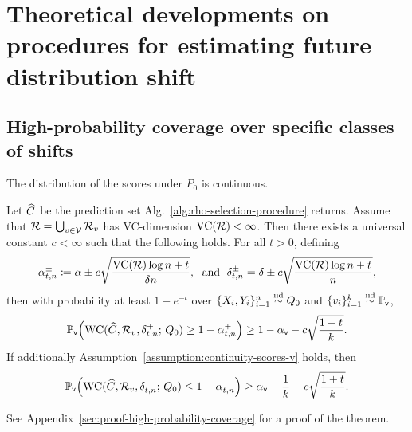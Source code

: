 \section{Theoretical developments on procedures for estimating future distribution shift}

\subsection{High-probability coverage over specific classes of shifts}
\label{sec:adaptive_procedure_shifts_high_prob_coverage}

\begin{assumption}
  \label{assumption:continuity-scores-v}
  The distribution of the scores under $P_0$ is continuous.
\end{assumption}

\begin{theorem}
  \label{theorem:high-probability-coverage}
  Let $\widehat{C}$ be the prediction set
  Alg.~\ref{alg:rho-selection-procedure} returns. Assume
  that $\mathcal{R} = \bigcup_{v
    \in \mathcal{V}} \mathcal{R}_v$ has VC-dimension $\textup{VC}(\mathcal{R}) < \infty$.
  Then there exists a universal constant $c < \infty$ such that the
  following holds. For
  all $t > 0$, defining
  \begin{equation*}
    \alpha_{t,n}^\pm \coloneqq \alpha \pm c
    \sqrt{\frac{\textup{VC}(\mathcal{R}) \log n + t}{\delta n}},
    \; \textrm{ and }\;
    \delta_{t,n}^\pm = \delta \pm c \sqrt{\frac{\textup{VC}(\mathcal{R}) \log n + t}{n}},
  \end{equation*}
  then with probability at least $1 - e^{-t}$ over
  $\{X_i, Y_i\}_{i = 1}^n \stackrel{\rm iid}{\sim} Q_0$ and
  $\{v_i\}_{i = 1}^k \stackrel{\rm iid}{\sim} \mathbb{P}_{\mathsf{v}}$,
  \begin{equation*}
    \mathbb{P}_{\mathsf{v}} \Big( \textup{WC}(\widehat{C}, \mathcal{R}_v, \delta_{t,n}^+; \, Q_0)
    \ge 1 - \alpha_{t,n}^+ \Big) \ge 1 - \alpha_{\mathsf{v}} - c \sqrt{\frac{1 + t}{k}}.
  \end{equation*}
  If additionally Assumption~\ref{assumption:continuity-scores-v}
  holds, then
  \begin{align*}
    \mathbb{P}_{\mathsf{v}}  \Big( \textup{WC}(\widehat{C}, \mathcal{R}_v, \delta_{t,n}^-; \, Q_0)
    \le 1 - \alpha_{t,n}^-  \Big)
    \ge \alpha_{\mathsf{v}} - \frac{1}{k} - c\sqrt{\frac{1 + t}{k}}.
  \end{align*}
\end{theorem}
\noindent
See Appendix~\ref{sec:proof-high-probability-coverage} for a proof of
the theorem.

